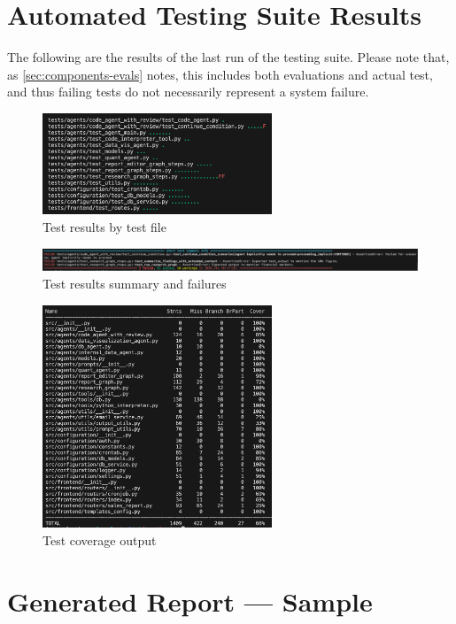 \documentclass[a4paper]{report}
\begin{document}
\chapter{Automated Testing Suite Results}
\label{annex:test-results}

The following are the results of the last run of the testing suite. Please note that, as \autoref{sec:components-evals} notes, this includes both evaluations and actual test, and thus failing tests do not necessarily represent a system failure.

\begin{figure}[H]
\centering
\includegraphics[width=0.61\textwidth]{images/test-results.png}
\caption{Test results by test file}
\end{figure}

\begin{figure}[H]
\centering
\includegraphics[width=1\textwidth]{images/test-results-bottom.png}
\caption{Test results summary and failures}
\end{figure}

\begin{figure}[H]
\centering
\includegraphics[width=0.61\textwidth]{images/test-coverage.png}
\caption{Test coverage output}
\end{figure}

\chapter{Generated Report --- Sample}
\end{document}
